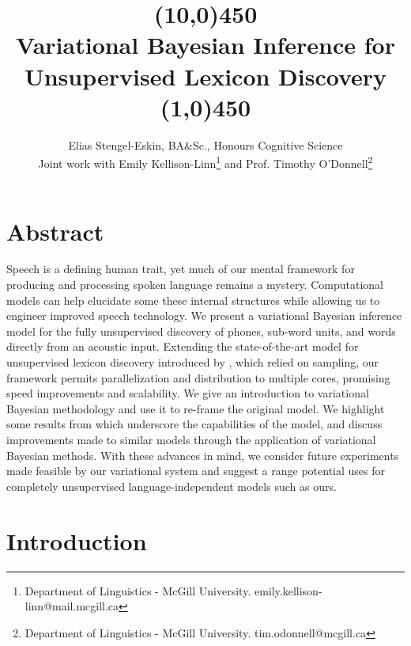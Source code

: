 \documentclass[12pt,letterpaper]{article}
\title{\vspace{-4em} \line(10,0){450}\\ Variational Bayesian Inference for Unsupervised Lexicon Discovery\\\vspace{-.7em} \line(1,0){450}}
\author{Elias Stengel-Eskin, BA\&Sc., Honours Cognitive Science \\
Joint work with Emily Kellison-Linn\footnote{Department of Linguistics - McGill University. emily.kellison-linn@mail.mcgill.ca} \: and Prof. Timothy O'Donnell\footnote{Department of Linguistics - McGill University. tim.odonnell@mcgill.ca}}
\date{}
\begin{document}
\maketitle

\section{Abstract}


Speech is a defining human trait, yet much of our mental framework for producing and processing spoken language remains a mystery. Computational models can help elucidate some these internal structures while allowing us to engineer improved speech technology. We present a variational Bayesian inference model for the fully unsupervised discovery of phones, sub-word units, and words directly from an acoustic input. Extending the state-of-the-art model for unsupervised lexicon discovery introduced by \citet{lee:2015}, which relied on sampling, our framework permits  parallelization and distribution to multiple cores, promising speed improvements and scalability. We give an introduction to variational Bayesian methodology and use it to re-frame the original model. We highlight some results from \citet{lee:2015} which underscore the capabilities of the model, and discuss improvements made to similar models through the application of variational Bayesian methods. With these advances in mind, we consider future experiments made feasible by our variational system and suggest a range potential uses for completely unsupervised language-independent models such as ours. 

\section{Introduction}
\end{document}
